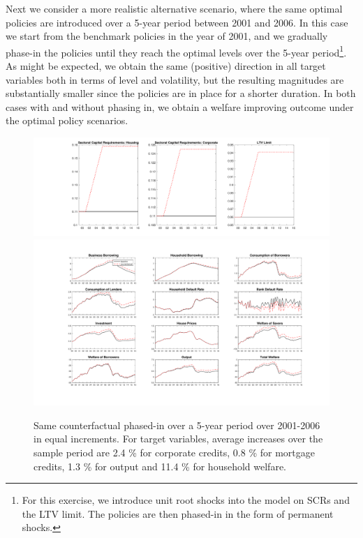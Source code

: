 \documentclass[12pt]{article}
\numberwithin{equation}{section}
\begin{document}
Next we consider a more realistic alternative scenario, where the same optimal policies are introduced over a 5-year period between 2001 and 2006. In this case we start from the benchmark policies in the year of 2001, and we gradually phase-in the policies until they reach the optimal levels over the 5-year period\footnote{For this exercise, we introduce unit root shocks into the model on SCRs and the LTV limit. The policies are then phased-in in the form of permanent shocks.}. As might be expected, we obtain the same (positive) direction in all target variables both in terms of level and volatility, but the resulting magnitudes are substantially smaller since the policies are in place for a shorter duration. In both cases with and without phasing in, we obtain a welfare improving outcome under the optimal policy scenarios. 

\begin{figure}[H]
\centering
\caption{Same counterfactual phased-in over a 5-year period over 2001-2006 in equal increments. For target variables, average increases  over the sample period are 2.4 \% for corporate credits, 0.8 \% for mortgage credits, 1.3 \% for output and 11.4 \% for household welfare.}
\label{counterfactual2}
\includegraphics[scale=0.35]{CF_policy_rules10.pdf}
\includegraphics[scale=0.4]{main_counterfactual_phaseIn.pdf}\\

\end{figure}
\end{document}
